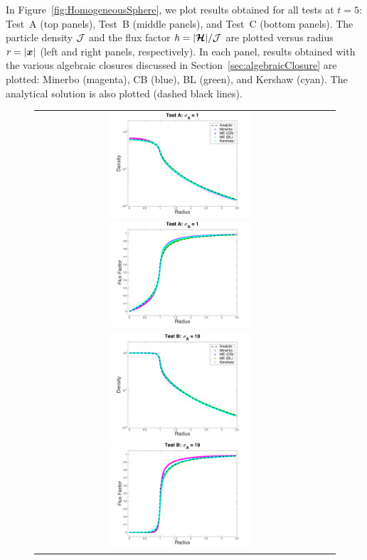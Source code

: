 In Figure~\ref{fig:HomogeneousSphere}, we plot results obtained for all tests at $t=5$: Test~A (top panels), Test~B (middle panels), and Test~C (bottom panels).  
The particle density $\mathcal{J}$ and the flux factor $h=|\boldsymbol{\mathcal{H}}|/\mathcal{J}$ are plotted versus radius $r=|\boldsymbol{x}|$ (left and right panels, respectively).  
In each panel, results obtained with the various algebraic closures discussed in Section~\ref{sec:algebraicClosure} are plotted: Minerbo (magenta), CB (blue), BL (green), and Kershaw (cyan).  
The analytical solution is also plotted (dashed black lines).  
\begin{figure}[h]
  \centering
  \begin{tabular}{cc}
    \includegraphics[width=0.5\textwidth]{figures/HomogeneousSphere_ClosureComparison_Chi_1e0_Density}
    \includegraphics[width=0.5\textwidth]{figures/HomogeneousSphere_ClosureComparison_Chi_1e0_FluxFactor} \\
    \includegraphics[width=0.5\textwidth]{figures/HomogeneousSphere_ClosureComparison_Chi_1e1_Density}
    \includegraphics[width=0.5\textwidth]{figures/HomogeneousSphere_ClosureComparison_Chi_1e1_FluxFactor} \\

\end{tabular}
\end{figure}
